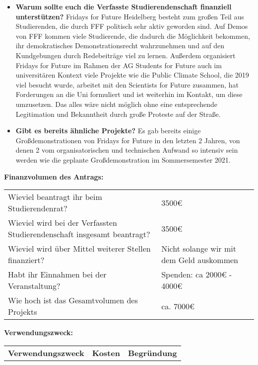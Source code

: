 {\begin{itemize}
        \item \textbf{ Warum sollte euch die Verfasste Studierendenschaft finanziell unterstützen?} Fridays for Future Heidelberg besteht zum großen Teil aus Studierenden, die durch FFF politisch sehr aktiv geworden sind. Auf Demos von FFF kommen viele Studierende, die dadurch die Möglichkeit bekommen, ihr demokratisches Demonstrationsrecht wahrzunehmen und auf den Kundgebungen durch Redebeiträge viel zu lernen. Außerdem organisiert Fridays for Future im Rahmen der AG Students for Future auch im universitären Kontext viele Projekte wie die Public Climate School, die 2019 viel besucht wurde, arbeitet mit den Scientists for Future zusammen, hat Forderungen an die Uni formuliert und ist weiterhin im Kontakt, um diese umzusetzen. Das alles wäre nicht möglich ohne eine entsprechende Legitimation und Bekanntheit durch große Proteste auf der Straße.
        \item \textbf{ Gibt es bereits ähnliche Projekte?} Es gab bereits einige Großdemonstrationen von Fridays for Future in den letzten 2 Jahren, von denen 2 vom organisatorischen und technischen Aufwand so intensiv sein werden wie die geplante Großdemonstration im Sommersemester 2021.
    \end{itemize}
    \textbf{Finanzvolumen des Antrags:}\\
    \begin{tabular}{l l}
        Wieviel beantragt ihr beim Studierendenrat?                             & 3500€ \\
        Wieviel wird bei der Verfassten Studierendenschaft insgesamt beantragt? & 3500€ \\
        Wieviel wird über Mittel weiterer Stellen finanziert?                   & Nicht solange wir mit dem Geld auskommen\\
        Habt ihr Einnahmen bei der Veranstaltung?                               & Spenden: ca 2000€ - 4000€ \\
        Wie hoch ist das Gesamtvolumen des Projekts                             & ca. 7000€\\
    \end{tabular}
    \newline
    \textbf{Verwendungszweck:}\\
    \begin{longtable}{p{3cm} p{1cm} p{11cm}}
        \endfirsthead
        \endhead
        \endfoot
        \endlastfoot
        \textbf{Verwendungszweck} & \textbf{Kosten} & \textbf{Begründung} \\

\end{longtable}}
